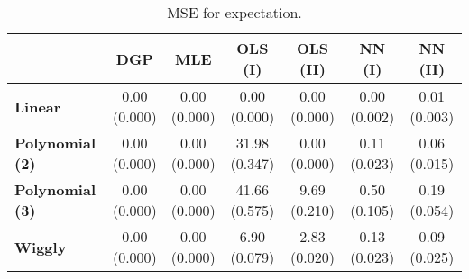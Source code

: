 \begin{table}[t]
\centering
\begin{threeparttable}
\caption{MSE for expectation.}
\label{4_simulation_single_table_excpect_MSE}
\begin{tabular}{l|cccccc}\toprule
& \textbf{DGP} & \textbf{MLE} & \textbf{OLS (I)} & \textbf{OLS (II)} & \textbf{NN (I)} & \textbf{NN (II)}\\\midrule
\vspace{6pt}\textbf{Linear} & \cellbreak[t]{0.00\\\footnotesize(0.000)} & \cellbreak[t]{0.00\\\footnotesize(0.000)} & \cellbreak[t]{0.00\\\footnotesize(0.000)} & \cellbreak[t]{0.00\\\footnotesize(0.000)} & \cellbreak[t]{0.00\\\footnotesize(0.002)} & \cellbreak[t]{0.01\\\footnotesize(0.003)}\\
\vspace{6pt}\textbf{Polynomial (2)} & \cellbreak[t]{0.00\\\footnotesize(0.000)} & \cellbreak[t]{0.00\\\footnotesize(0.000)} & \cellbreak[t]{31.98\\\footnotesize(0.347)} & \cellbreak[t]{0.00\\\footnotesize(0.000)} & \cellbreak[t]{0.11\\\footnotesize(0.023)} & \cellbreak[t]{0.06\\\footnotesize(0.015)}\\
\vspace{6pt}\textbf{Polynomial (3)} & \cellbreak[t]{0.00\\\footnotesize(0.000)} & \cellbreak[t]{0.00\\\footnotesize(0.000)} & \cellbreak[t]{41.66\\\footnotesize(0.575)} & \cellbreak[t]{9.69\\\footnotesize(0.210)} & \cellbreak[t]{0.50\\\footnotesize(0.105)} & \cellbreak[t]{0.19\\\footnotesize(0.054)}\\
\vspace{6pt}\textbf{Wiggly} & \cellbreak[t]{0.00\\\footnotesize(0.000)} & \cellbreak[t]{0.00\\\footnotesize(0.000)} & \cellbreak[t]{6.90\\\footnotesize(0.079)} & \cellbreak[t]{2.83\\\footnotesize(0.020)} & \cellbreak[t]{0.13\\\footnotesize(0.023)} & \cellbreak[t]{0.09\\\footnotesize(0.025)}\\

\end{tabular}
\end{threeparttable}
\end{table}
